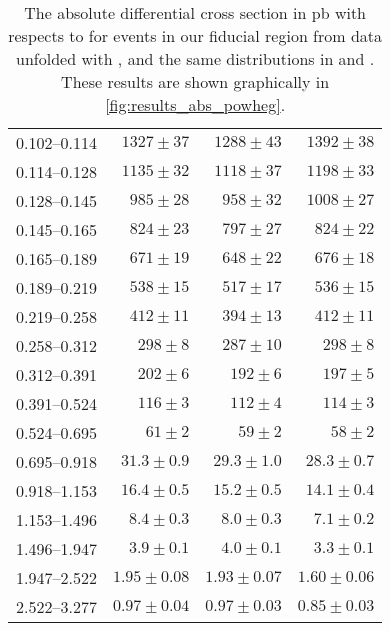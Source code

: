 \begin{table}
\begin{center}
\begin{tabular}{@{}l r r r@{}}
            0.102--0.114  &  $1327  \pm  37$    &  $1288  \pm  43$    &  $1392  \pm  38$    \\
            0.114--0.128  &  $1135  \pm  32$    &  $1118  \pm  37$    &  $1198  \pm  33$    \\
            0.128--0.145  &  $985   \pm  28$    &  $958   \pm  32$    &  $1008  \pm  27$    \\
            0.145--0.165  &  $824   \pm  23$    &  $797   \pm  27$    &  $824   \pm  22$    \\
            0.165--0.189  &  $671   \pm  19$    &  $648   \pm  22$    &  $676   \pm  18$    \\
            0.189--0.219  &  $538   \pm  15$    &  $517   \pm  17$    &  $536   \pm  15$    \\
            0.219--0.258  &  $412   \pm  11$    &  $394   \pm  13$    &  $412   \pm  11$    \\
            0.258--0.312  &  $298   \pm  8$     &  $287   \pm  10$    &  $298   \pm  8$     \\
            0.312--0.391  &  $202   \pm  6$     &  $192   \pm  6$     &  $197   \pm  5$     \\
            0.391--0.524  &  $116   \pm  3$     &  $112   \pm  4$     &  $114   \pm  3$     \\
            0.524--0.695  &  $61    \pm  2$     &  $59    \pm  2$     &  $58    \pm  2$     \\
            0.695--0.918  &  $31.3  \pm  0.9$   &  $29.3  \pm  1.0$   &  $28.3  \pm  0.7$   \\
            0.918--1.153  &  $16.4  \pm  0.5$   &  $15.2  \pm  0.5$   &  $14.1  \pm  0.4$   \\
            1.153--1.496  &  $8.4   \pm  0.3$   &  $8.0   \pm  0.3$   &  $7.1   \pm  0.2$   \\
            1.496--1.947  &  $3.9   \pm  0.1$   &  $4.0   \pm  0.1$   &  $3.3   \pm  0.1$   \\
            1.947--2.522  &  $1.95  \pm  0.08$  &  $1.93  \pm  0.07$  &  $1.60  \pm  0.06$  \\
            2.522--3.277  &  $0.97  \pm  0.04$  &  $0.97  \pm  0.03$  &  $0.85  \pm  0.03$  \\
            \bottomrule
        \end{tabular}
    \end{center}
    \caption[
        The absolute differential cross section in \si{\pico\barn} with
        respects to \phistar for \Ztoee events in our fiducial region from data
        unfolded with \POWHEG.
    ]{
        The absolute differential cross section in \si{\pico\barn} with
        respects to \phistar for \Ztoee events in our fiducial region from data
        unfolded with \POWHEG, and the same distributions in \MADGRAPH and
        \POWHEG. These results are shown graphically in
        \cref{fig:results_abs_powheg}.
    }
    \label{tab:results_abs_powheg}
\end{table}
